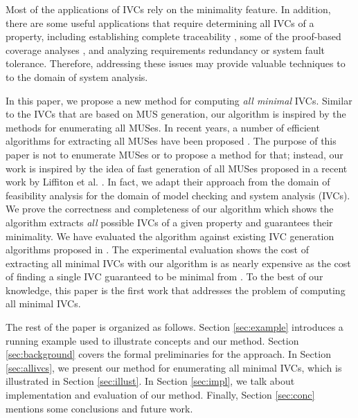 Most of the applications of IVCs rely on the minimality feature. In addition, there are some useful 
applications that require determining all IVCs of a property, including establishing complete traceability \cite{Murugesan16:renext}, some of the proof-based coverage analyses \cite{Ghass17Cov},
and analyzing requirements redundancy or system fault tolerance. Therefore, addressing these issues may provide valuable techniques to to the domain of system analysis. 

In this paper, we propose a new method for computing \emph{all minimal} IVCs. Similar to the IVCs that are based on MUS generation, our algorithm is inspired by the methods for enumerating all MUSes. In  recent  years,  a  number  of  efficient
algorithms  for  extracting  all MUSes  have  been proposed \cite{Bacchus2016, bacchus2015using, belov2012muser2, belov2013core, belov2012towards, nadel2014accelerated, liffiton2005max}.
The purpose of this paper is not to enumerate MUSes or to propose a method for that; instead, our work is inspired by the idea of fast generation of all MUSes proposed in a recent work by Liffiton et al. \cite{marco2016fast}. In fact, we adapt their approach from the domain of feasibility analysis for the domain of model checking and system analysis (IVCs). 
We prove the correctness and completeness of our algorithm which shows the algorithm extracts \emph{all} possible IVCs of a given property and guarantees their minimality.
We have evaluated the algorithm against existing IVC generation algorithms proposed in \cite{Ghass16}. The experimental evaluation shows the cost of extracting all minimal IVCs with our algorithm is as nearly expensive as the cost of finding a single IVC guaranteed to be minimal from \cite{Ghass16}.
To the best of our knowledge, this paper is the first work that addresses the problem of computing all minimal IVCs.

The rest of the paper is organized as follows. 
Section \ref{sec:example} introduces a running example used to illustrate concepts and our method. 
Section \ref{sec:background} covers the formal preliminaries for the approach. 
In Section \ref{sec:allivcs}, we present our method for enumerating all minimal IVCs, 
which is illustrated in
Section \ref{sec:illust}. In Section \ref{sec:impl}, we talk about implementation and evaluation of our method. Finally, Section \ref{sec:conc} mentions some conclusions and future work. 